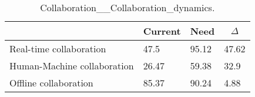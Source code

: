 
  \begin{table*}[]
  \centering
  \notsotiny
  \caption{ Collaboration__Collaboration_dynamics.}
\label{tab:collaboration__collaboration_dynamics}
\begin{tabular}{|l|l|l|l|}
  \hline
  \rowcolor[HTML]{C0C0C0}
    \multicolumn{1}{|c|}{Feature} & \multicolumn{1}{c|}{Current} & \multicolumn{1}{c|}{Need} & \multicolumn{1}{c|}{$\Delta$} \\ \hline
  Real-time collaboration & 47.5 & 95.12 & 47.62 \\ \hline 
Human-Machine collaboration & 26.47 & 59.38 & 32.9 \\ \hline 
Offline collaboration & 85.37 & 90.24 & 4.88 \\ \hline 
\end{tabular}%
  \end{table*}